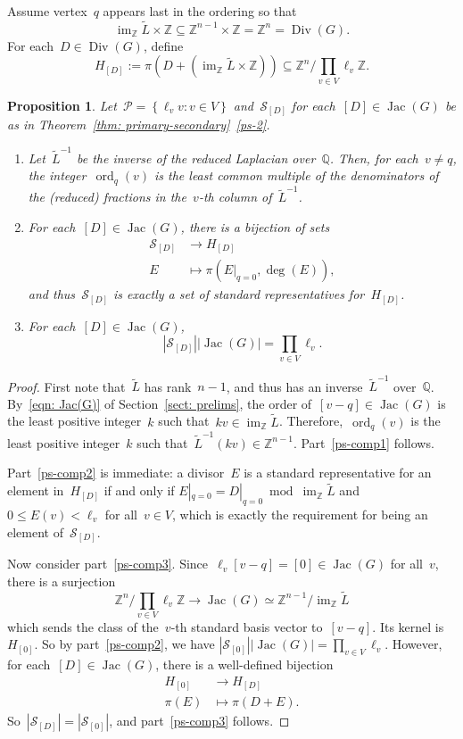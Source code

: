 \documentclass{amsart}
\newtheorem{prop}[thm]{Proposition}
\DeclareMathOperator{\Jac}{Jac}
\DeclareMathOperator{\Div}{Div}
\DeclareMathOperator{\im}{im}
\DeclareMathOperator{\ord}{ord}
\newcommand{\primary}{\mathcal{P}}
\newcommand{\secondary}{\mathcal{S}}
\newcommand{\Z}{\mathbb{Z}}
\newcommand{\Q}{\mathbb{Q}}
\newcommand{\tL}{\tilde{L}}
\newcommand{\tl}{\ell}
\begin{document}
Assume vertex~$q$ appears last in the ordering so that
\[
  \im_{\Z}\tL\times\Z\subseteq\Z^{n-1}\times\Z=\Z^n=\Div(G).
\]
For each~$D\in\Div(G)$, define
\[
  H_{[D]}:=\pi(D+(\im_{\Z}\tL\times\Z))\subseteq\Z^n/\prod_{v\in V}\tl_v\Z.
\]
\begin{prop}\label{prop: ps-computation} Let~$\primary=\left\{ \tl_v v:v\in V
  \right\}$ and~$\secondary_{[D]}$ for each~$[D]\in\Jac(G)$ be as in
  Theorem~\ref{thm: primary-secondary}~\ref{ps-2}.
  \begin{enumerate}[label=\rm{(\arabic*)},leftmargin=*]
    \item\label{ps-comp1}  Let~$\tL^{-1}$ be the inverse of the reduced Laplacian
      over~$\Q$. Then, for each~$v\neq q$, the integer~$\ord_{q}(v)$ is the least common multiple
      of the denominators of the (reduced) fractions in the~$v$-th column
      of~$\tL^{-1}$.
    \item\label{ps-comp2} For each~$[D]\in\Jac(G)$, there is a bijection of sets
      \begin{align*}
	\secondary_{[D]}&\to H_{[D]}\\
	E&\mapsto\pi(E|_{q=0},\deg(E)),
      \end{align*}
      and thus~$\secondary_{[D]}$ is exactly a set of standard representatives
      for~$H_{[D]}$.
    \item\label{ps-comp3} For each~$[D]\in\Jac(G)$,
      \[
	|\secondary_{[D]}||\Jac(G)|=\prod_{v\in V}\tl_v.
      \]
  \end{enumerate}
\end{prop}
\begin{proof} First note that~$\tL$ has rank~$n-1$, and thus has an
  inverse~$\tL^{-1}$ over~$\Q$.  By~\eqref{eqn: Jac(G)} of Section~\ref{sect:
  prelims}, the order of~$[v-q]\in\Jac(G)$ is the least positive integer~$k$
  such that~$kv\in\im_{\Z}\tL$.  Therefore,~$\ord_{q}(v)$ is the least positive
  integer~$k$ such that~$\tL^{-1}(kv)\in\Z^{n-1}$. Part~\ref{ps-comp1} follows.

  Part~\ref{ps-comp2} is immediate: a divisor~$E$ is a standard representative
  for an element in~$H_{[D]}$ if and only if $E|_{q=0}=D|_{q=0} \bmod\im_{\Z}\tL$ and
  $0\leq E(v)<\tl_v$ for all~$v\in V$, which is exactly the requirement for
  being an element of~$\secondary_{[D]}$.

  Now consider part~\ref{ps-comp3}.
  Since~$\tl_v[v-q]=[0]\in\Jac(G)$ for all~$v$, there is a surjection
  \[
    \textstyle \Z^n/\prod_{v\in V}\tl_v\Z\to\Jac(G)\simeq\Z^{n-1}/\im_{\Z}\tL
  \]
  which sends the class of the~$v$-th standard basis vector to~$[v-q]$.
  Its kernel is~$H_{[0]}$.  So by part~\ref{ps-comp2}, we have
  $|\secondary_{[0]}||\Jac(G)|=\prod_{v\in V}\tl_v$.  However, for
  each~$[D]\in\Jac(G)$, there is a
  well-defined bijection
  \begin{align*}
    H_{[0]}&\to H_{[D]}\\
    \pi(E)&\mapsto\pi(D+E).
  \end{align*}
  So~$|\secondary_{[D]}|=|\secondary_{[0]}|$, and part~\ref{ps-comp3} follows.
\end{proof}
\end{document}
